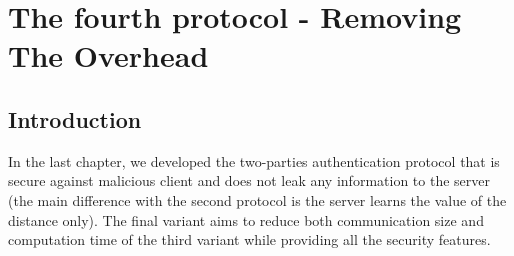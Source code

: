\chapter{The fourth protocol - Removing The Overhead}
\label{chap:fourthProtocol}

\ifpdf
    \graphicspath{{Chapter7/Figs/Raster/}{Chapter7/Figs/PDF/}{Chapter7/Figs/}}
\else
    \graphicspath{{Chapter7/Figs/Vector/}{Chapter7/Figs/}}
\fi


\section{Introduction}
\label{sec:6intro}
In the last chapter, we developed the two-parties authentication protocol that
is secure against malicious client and does not leak any information to the
server (the main difference with the second protocol is the server learns the
value of the distance only). The final variant aims to reduce both communication
size and computation time of the third variant while providing all the security
features.
